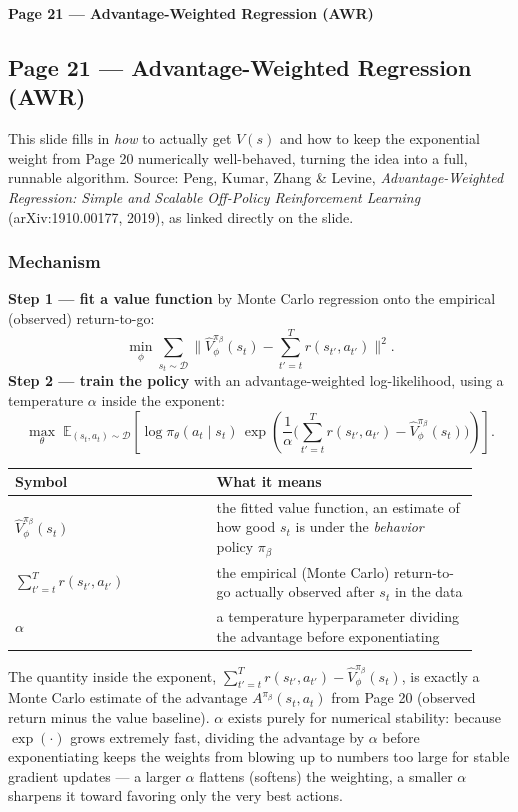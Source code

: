 \bigskip

\textbf{Page 21 --- Advantage-Weighted Regression (AWR)}

\subsection*{Page 21 --- Advantage-Weighted Regression (AWR)}

This slide fills in \emph{how} to actually get $V(s)$ and how to keep the exponential weight from Page 20 numerically well-behaved, turning the idea into a full, runnable algorithm. Source: Peng, Kumar, Zhang \& Levine, \emph{Advantage-Weighted Regression: Simple and Scalable Off-Policy Reinforcement Learning} (arXiv:1910.00177, 2019), as linked directly on the slide.

\subsubsection*{Mechanism}

\textbf{Step 1 --- fit a value function} by Monte Carlo regression onto the empirical (observed) return-to-go:
\[
\min_\phi \sum_{s_t\sim\mathcal{D}} \Big\lVert \hat V^{\pi_\beta}_\phi(s_t) - \sum_{t'=t}^{T} r(s_{t'},a_{t'})\Big\rVert^2.
\]
\textbf{Step 2 --- train the policy} with an advantage-weighted log-likelihood, using a temperature $\alpha$ inside the exponent:
\[
\max_\theta\; \mathbb{E}_{(s_t,a_t)\sim\mathcal{D}}\left[\log \pi_\theta(a_t\mid s_t)\, \exp\!\left(\frac{1}{\alpha}\Big(\sum_{t'=t}^{T} r(s_{t'},a_{t'}) - \hat V^{\pi_\beta}_\phi(s_t)\Big)\right)\right].
\]

\begin{center}
\begin{tabular}{@{}p{0.4\linewidth}p{0.52\linewidth}@{}}
\toprule
Symbol & What it means \\
\midrule
$\hat V^{\pi_\beta}_\phi(s_t)$ & the fitted value function, an estimate of how good $s_t$ is under the \emph{behavior} policy $\pi_\beta$ \\
$\sum_{t'=t}^T r(s_{t'},a_{t'})$ & the empirical (Monte Carlo) return-to-go actually observed after $s_t$ in the data \\
$\alpha$ & a temperature hyperparameter dividing the advantage before exponentiating \\
\bottomrule
\end{tabular}
\end{center}

The quantity inside the exponent, $\sum_{t'=t}^T r(s_{t'},a_{t'}) - \hat V^{\pi_\beta}_\phi(s_t)$, is exactly a Monte Carlo estimate of the advantage $A^{\pi_\beta}(s_t,a_t)$ from Page 20 (observed return minus the value baseline). $\alpha$ exists purely for numerical stability: because $\exp(\cdot)$ grows extremely fast, dividing the advantage by $\alpha$ before exponentiating keeps the weights from blowing up to numbers too large for stable gradient updates --- a larger $\alpha$ flattens (softens) the weighting, a smaller $\alpha$ sharpens it toward favoring only the very best actions.


